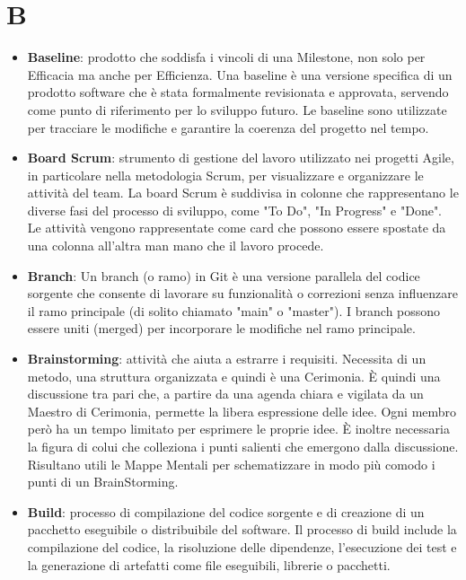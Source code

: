 \documentclass[a4paper,12pt]{article}
\begin{document}
\section{B}
\begin{itemize}
    \item \textbf{Baseline}: prodotto che soddisfa i vincoli di una Milestone, non solo per Efficacia ma anche per Efficienza. Una baseline è una versione specifica di un prodotto software che è stata formalmente revisionata e approvata, servendo come punto di riferimento per lo sviluppo futuro. Le baseline sono utilizzate per tracciare le modifiche e garantire la coerenza del progetto nel tempo.
    \item \textbf{Board Scrum}: strumento di gestione del lavoro utilizzato nei progetti Agile, in particolare nella metodologia Scrum, per visualizzare e organizzare le attività del team. La board Scrum è suddivisa in colonne che rappresentano le diverse fasi del processo di sviluppo, come "To Do", "In Progress" e "Done". Le attività vengono rappresentate come card che possono essere spostate da una colonna all'altra man mano che il lavoro procede.
    \item \textbf{Branch}: Un branch (o ramo) in Git è una versione parallela del codice sorgente che consente di lavorare su funzionalità o correzioni senza influenzare il ramo principale (di solito chiamato "main" o "master"). I branch possono essere uniti (merged) per incorporare le modifiche nel ramo principale.
    \item \textbf{Brainstorming}: attività che aiuta a estrarre i requisiti. Necessita di un metodo, una struttura organizzata e quindi è una Cerimonia. È quindi una discussione tra pari che, a partire da una agenda chiara e vigilata da un Maestro di Cerimonia, permette la libera espressione delle idee. Ogni membro però ha un tempo limitato per esprimere le proprie idee. È inoltre necessaria la figura di colui che colleziona i punti salienti che emergono dalla discussione. Risultano utili le Mappe Mentali per schematizzare in modo più comodo i punti di un BrainStorming.
    \item \textbf{Build}: processo di compilazione del codice sorgente e di creazione di un pacchetto eseguibile o distribuibile del software. Il processo di build include la compilazione del codice, la risoluzione delle dipendenze, l'esecuzione dei test e la generazione di artefatti come file eseguibili, librerie o pacchetti.
\end{itemize}
\end{document}
